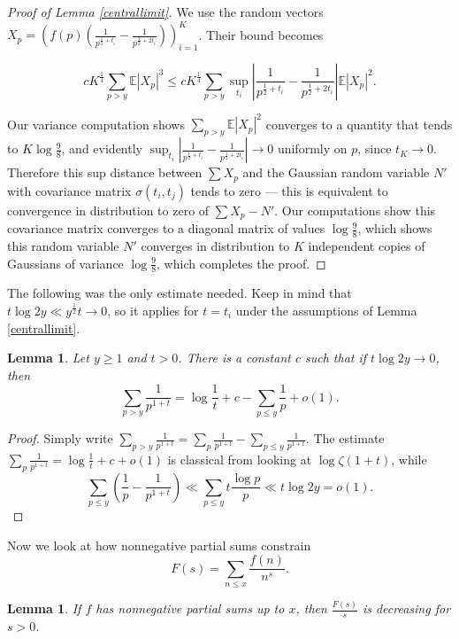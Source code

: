 \documentclass[12pt]{amsart}
\def\E{\mathbb E}
\newtheorem{lemma}[theorem]{Lemma}
\theoremstyle{remark}
\theoremstyle{definition}
\theoremstyle{remark}
\numberwithin{equation}{section}
\begin{document}
\begin{proof}[Proof of Lemma \ref{centrallimit}]
    
    We use the random vectors $X_p = \left(f(p)\left(\frac{1}{p^{\frac{1}{2}+t_{i}}}-\frac{1}{p^{\frac{1}{2}+2t_{i}}}\right)\right)_{i=1}^K$. Their bound becomes

    $$cK^{\frac{1}{4}} \sum_{p>y} \E|X_p|^3 \le c K^{\frac{1}{4}}\sum_{p>y}\sup_{t_i}\left| \frac{1}{p^{\frac{1}{2}+t_i}}-\frac{1}{p^{\frac{1}{2}+2t_i}}\right|\E|X_p|^2.$$

    Our variance computation shows $\sum_{p>y} \E|X_p|^2$ converges to a quantity that tends to $K\log \frac{9}{8}$, and evidently $\sup_{t_i}\left| \frac{1}{p^{\frac{1}{2}+t_i}}-\frac{1}{p^{\frac{1}{2}+2t_i}}\right|\rightarrow 0$ uniformly on $p$, since $t_K \rightarrow 0$. Therefore this sup distance between $\sum X_p$ and the Gaussian random variable $N'$ with covariance matrix $\sigma(t_i, t_j)$ tends to zero --- this is equivalent to convergence in distribution to zero of $\sum X_p - N'$. Our computations show this covariance matrix converges to a diagonal matrix of values $\log \frac{9}{8}$, which shows this random variable $N'$ converges in distribution to $K$ independent copies of Gaussians of variance $\log \frac{9}{8}$, which completes the proof.


\end{proof}




The following was the only estimate needed. Keep in mind that $t \log 2y \ll y^{\frac{1}{2}}t \rightarrow 0$, so it applies for $t = t_i$ under the assumptions of Lemma \ref{centrallimit}.

\begin{lemma}\label{approximation} Let $y\ge 1$ and $t >0$. There is a constant $c$ such that if $t \log 2y  \rightarrow 0$, then 
    $$\sum_{p>y} \frac{1}{p^{1+t}} = \log \frac{1}{t}+c-\sum_{p \le y} \frac{1}{p}+ o(1).$$
\end{lemma}

\begin{proof}
    Simply write $\sum_{p>y} \frac{1}{p^{1+t}} = \sum_{p} \frac{1}{p^{1+t}} - \sum_{p\le y} \frac{1}{p^{1+t}}$. The estimate $\sum_{p} \frac{1}{p^{1+t}} = \log \frac{1}{t} +c+o(1)$ is classical from looking at $\log \zeta(1+t)$, while
    $$\sum_{p\le y} \left(\frac{1}{p}- \frac{1}{p^{1+t}}\right) \ll \sum_{p \le y} t\frac{\log p}{p} \ll t \log 2y = o(1).$$
\end{proof}

Now we look at how nonnegative partial sums constrain
$$F(s) = \sum_{n \le x} \frac{f(n)}{n^s}.$$

\begin{lemma}\label{decreasing} 
    If $f$ has nonnegative partial sums up to $x$, then $\frac{F(s)}{s}$ is decreasing for $s>0$.
\end{lemma}
\end{document}
